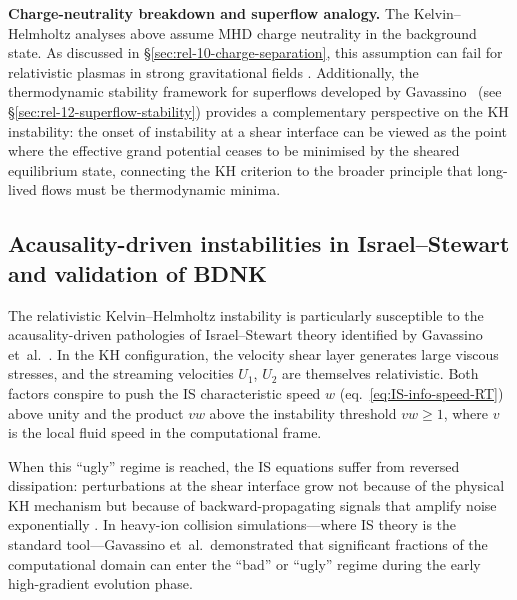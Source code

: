
\begin{relcorrection}
\textbf{Charge-neutrality breakdown and superflow analogy.}
The Kelvin--Helmholtz analyses above assume MHD charge neutrality in
the background state.  As discussed in
\S\ref{sec:rel-10-charge-separation}, this assumption can fail for
relativistic plasmas in strong gravitational fields
\cite{GavassinoChargeSeparation2025}.  Additionally, the
thermodynamic stability framework for superflows developed by
Gavassino~\cite{GavassinoSuperflows2025} (see
\S\ref{sec:rel-12-superflow-stability}) provides a complementary
perspective on the KH instability: the onset of instability at a
shear interface can be viewed as the point where the effective grand
potential ceases to be minimised by the sheared equilibrium state,
connecting the KH criterion to the broader principle that
long-lived flows must be thermodynamic minima.
\end{relcorrection}


\subsection{Acausality-driven instabilities in Israel--Stewart and validation of BDNK}
\label{sec:rel-11-IS-acausality-KH}

The relativistic Kelvin--Helmholtz instability is particularly
susceptible to the acausality-driven pathologies of Israel--Stewart
theory identified by Gavassino et~al.\
\citep{GavassinoAcausalityIS2025}.  In the KH configuration,
the velocity shear layer generates large viscous stresses, and the
streaming velocities $U_{1}$, $U_{2}$ are themselves relativistic.
Both factors conspire to push the IS characteristic speed
$w$ (eq.~\ref{eq:IS-info-speed-RT}) above unity and the product $vw$
above the instability threshold $vw \ge 1$, where $v$ is the local
fluid speed in the computational frame.

When this ``ugly'' regime is reached, the IS equations suffer from
reversed dissipation: perturbations at the shear interface grow not
because of the physical KH mechanism but because of backward-propagating
signals that amplify noise exponentially
\citep{GavassinoAcausalityIS2025,GavassinoCausalityHIC2025}.  In
heavy-ion collision simulations---where IS theory is the standard
tool---Gavassino et~al.\ demonstrated that significant fractions
of the computational domain can enter the ``bad'' or ``ugly'' regime
during the early high-gradient evolution phase.

